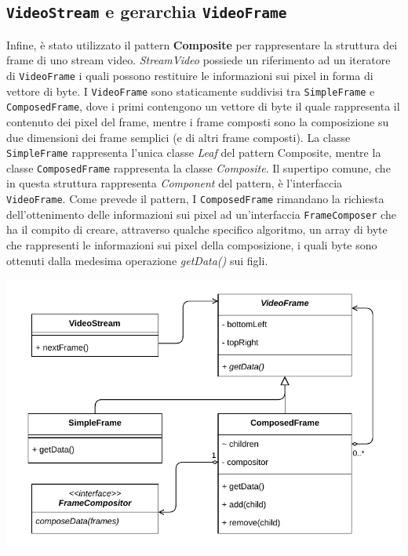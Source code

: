 \documentclass[a4paper,11pt]{article}
\begin{document}
	
	\subsection{\texttt{VideoStream} e gerarchia \texttt{VideoFrame}}
	Infine, è stato utilizzato il pattern \textbf{Composite} per rappresentare la struttura dei frame di uno stream video. \textit{StreamVideo} possiede un riferimento ad un iteratore di \texttt{VideoFrame} i quali possono restituire le informazioni sui pixel in forma di vettore di byte. I \texttt{VideoFrame} sono staticamente suddivisi tra \texttt{SimpleFrame} e \texttt{ComposedFrame}, dove i primi contengono un vettore di byte il quale rappresenta il contenuto dei pixel del frame, mentre i frame composti sono la composizione su due dimensioni dei frame semplici (e di altri frame composti). La classe \texttt{SimpleFrame} rappresenta l'unica classe \textit{Leaf} del pattern Composite, mentre la classe \texttt{ComposedFrame} rappresenta la classe \textit{Composite}. Il supertipo comune, che in questa struttura rappresenta \textit{Component} del pattern, è l'interfaccia \texttt{VideoFrame}. 
	Come prevede il pattern, I \texttt{ComposedFrame} rimandano la richiesta dell'ottenimento delle informazioni sui pixel ad un'interfaccia \texttt{FrameComposer} che ha il compito di creare, attraverso qualche specifico algoritmo, un array di byte che rappresenti le informazioni sui pixel della composizione, i quali byte sono ottenuti dalla medesima operazione \textit{getData()} sui figli.
	\begin{minipage}[c]{\textwidth}
		\centering
		\includegraphics[width=.5\textwidth]{diagramma/ClassDiagramm-VideoStream.pdf}
		\label{fig:videostream}
	\end{minipage}
	
\end{document}
